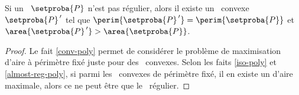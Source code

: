 

\begin{fact} \label{nece-cond}
	Si un \ngone\ $\setproba{P}$ n'est pas régulier,
	alors il existe un \ngone\ convexe $\setproba{P}^{\,\prime}$ tel que
	$\perim{\setproba{P}^{\,\prime}} = \perim{\setproba{P}}$ 
	et 
	$\area{\setproba{P}^{\,\prime}} > \area{\setproba{P}}$.
\end{fact}


\begin{proof}
	Le fait \ref{conv-poly} permet de considérer le problème de maximisation d'aire à périmètre fixé juste pour des \ngones\ convexes.
	Selon les faits \ref{iso-poly} et \ref{almost-reg-poly}, si parmi les \ngones\ convexes de périmètre fixé, il en existe un d'aire maximale, alors ce ne peut être que le \ngone\ régulier.
\end{proof}
